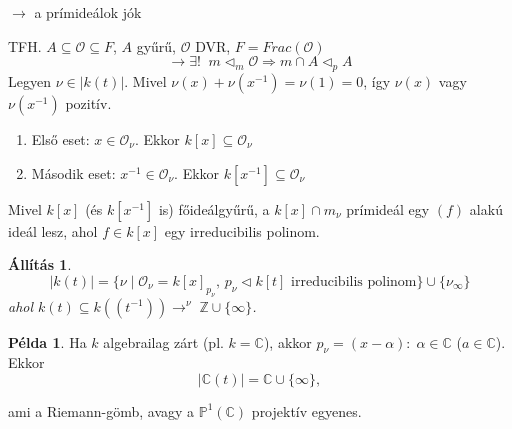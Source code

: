 \documentclass[11pt,a4paper]{article}
\newtheorem{allitas}[tetel]{Állítás}
\theoremstyle{definition}
\newtheorem{pelda}[tetel]{Példa}
\newcommand{\OO}{\mathcal O}
\begin{document}
$\longrightarrow$ a prímideálok jók


TFH. $A \subseteq \OO \subseteq F$, $A$ gyűrű, $\OO$ DVR, $F=Frac(\OO)$
 $$\longrightarrow \exists! \; \; m \vartriangleleft_m \OO \Rightarrow m \cap A \vartriangleleft_p A$$
Legyen $\nu \in |k(t)|$. Mivel $\nu(x)+\nu(x^{-1})=\nu(1)=0$, így $\nu(x)$ vagy $\nu(x^{-1})$ pozitív.
\begin{enumerate}
    \item Első eset: $x \in \OO_\nu$. Ekkor $k[x] \subseteq \OO_{\nu}$
    \item Második eset: $x^{-1} \in \OO_{\nu}$. Ekkor $k[x^{-1}] \subseteq \OO_\nu$
\end{enumerate}

Mivel $k[x]$ (és $k[x^{-1}]$ is) főideálgyűrű, a $k[x] \cap m_\nu$ prímideál egy $(f)$ alakú ideál lesz, ahol $f \in k[x]$ egy irreducibilis polinom.


\begin{allitas}
 $$|k(t)| = \{ \nu \; |\; \OO_\nu = k[x]_{p_\nu}, \, p_\nu \vartriangleleft k[t] \text{ irreducibilis polinom} \} \cup \{ \nu_\infty \}$$
ahol $k(t) \subseteq k((t^{-1})) \longrightarrow^\nu \; \mathbb{Z} \cup \{ \infty \}$.
\end{allitas}

\begin{pelda}
Ha $k$ algebrailag zárt (pl. $k = \mathbb{C}$), akkor $p_\nu=(x-\alpha ): \; \alpha \in \mathbb{C} $ ($a \in \mathbb{C}$). Ekkor
$$|\mathbb{C}(t)| = \mathbb{C} \cup \{\infty\},$$

ami a Riemann-gömb, avagy a $\mathbb{P}^1(\mathbb{C})$ projektív egyenes.
\end{pelda}
\end{document}
